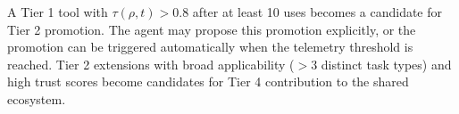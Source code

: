 A Tier 1 tool with $\tau(\rho, t) > 0.8$ after at least 10 uses becomes a
candidate for Tier 2 promotion. The agent may propose this promotion explicitly,
or the promotion can be triggered automatically when the telemetry threshold is
reached. Tier 2 extensions with broad applicability ($> 3$ distinct task types)
and high trust scores become candidates for Tier 4 contribution to the shared
ecosystem.


